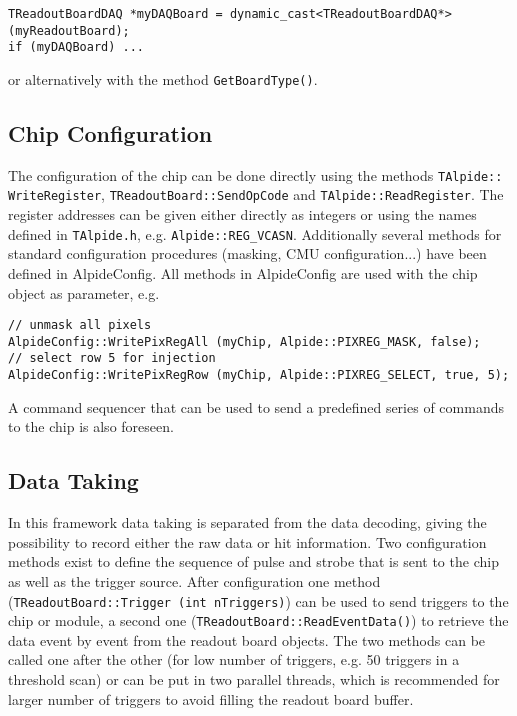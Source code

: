 \documentclass{article}
\begin{document}
\begin{lstlisting}
TReadoutBoardDAQ *myDAQBoard = dynamic_cast<TReadoutBoardDAQ*>(myReadoutBoard);
if (myDAQBoard) ... 
\end{lstlisting}

or alternatively with the method \texttt{GetBoardType()}.


\subsection{Chip Configuration}

The configuration of the chip can be done directly using the
methods \texttt{TAlpide::} \texttt{WriteRegister}, \texttt{TReadoutBoard::SendOpCode} and
\texttt{TAlpide::ReadRegister}. The register addresses can be given either
directly as integers or using the names defined in \texttt{TAlpide.h},
e.g. \texttt{Alpide::REG\_VCASN}. Additionally several methods for
standard configuration procedures (masking, CMU configuration...) have
been defined in AlpideConfig. All methods in AlpideConfig are used
with the chip object as parameter, e.g.
\begin{lstlisting}
// unmask all pixels
AlpideConfig::WritePixRegAll (myChip, Alpide::PIXREG_MASK, false);
// select row 5 for injection 
AlpideConfig::WritePixRegRow (myChip, Alpide::PIXREG_SELECT, true, 5);
\end{lstlisting}

A command sequencer that can be used to send a predefined series of
commands to the chip is also foreseen. 



\subsection {Data Taking}

In this framework data taking is separated from the data decoding,
giving the possibility to record either the raw data or hit
information. Two configuration methods exist to define the sequence of
pulse and strobe that is sent to the chip as well as the trigger
source. After configuration one method (\texttt{TReadoutBoard::Trigger (int
  nTriggers)}) can be used to send triggers to the chip
or module, a second one (\texttt{TReadoutBoard::ReadEventData()})
to retrieve the data event by event from the readout board objects. The two
methods can be called one after the other (for low number of triggers,
e.g. 50 triggers in a threshold scan) or can be put in two parallel
threads, which is recommended for larger number of triggers to avoid
filling the readout board buffer. 
\end{document}
